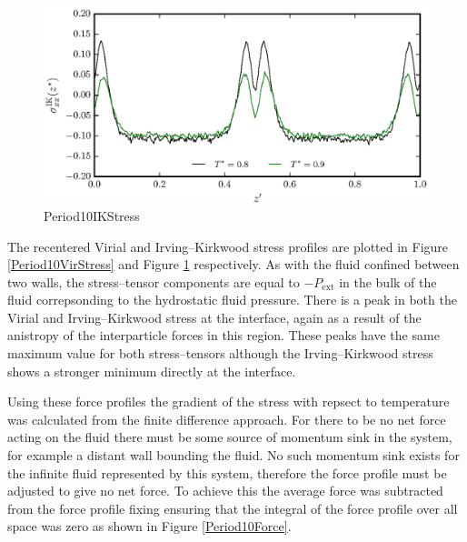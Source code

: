 \begin{figure}[h]
\centering
\includegraphics[scale=0.8]{Period10IKStress}
\caption{Period10IKStress}
\label{Period10IKStress}
\end{figure}
The recentered Virial and Irving--Kirkwood stress profiles are plotted in Figure \ref{Period10VirStress} and Figure \ref{Period10IKStress} respectively.
As with the fluid confined between two walls, the stress--tensor components are equal to $-P_{\mathrm{ext}}$ in the bulk of the fluid correpsonding to the hydrostatic fluid pressure.
There is a peak in both the Virial and Irving--Kirkwood stress at the interface, again as a result of the anistropy of the interparticle forces in this region.
These peaks have the same maximum value for both stress--tensors although the Irving--Kirkwood stress shows a stronger minimum directly at the interface.

\FloatBarrier
Using these force profiles the gradient of the stress with repsect to temperature was calculated from the finite difference approach.
For there to be no net force acting on the fluid there must be some source of momentum sink in the system, for example a distant wall bounding the fluid.
No such momentum sink exists for the infinite fluid represented by this system, therefore the force profile must be adjusted to give no net force.
To achieve this the average force was subtracted from the force profile fixing ensuring that the integral of the force profile over all space was zero as shown in Figure \ref{Period10Force}.

